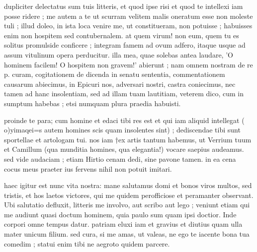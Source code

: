 


 dupliciter delectatus sum tuis litteris, et quod ipse risi et quod te intellexi iam posse ridere ; me autem a te ut scurram velitem malis oneratum esse non moleste tuli ; illud doleo, in ista loca venire me, ut constitueram, non potuisse ; habuisses enim non hospitem sed contubernalem. at quem virum! non eum, quem tu es solitus promulside conficere ; integram famem ad ovum adfero, itaque usque ad assum vitulinum opera perducitur. illa mea, quae solebas antea laudare, 'O hominem facilem! O hospitem non gravem!' abierunt ; nam omnem nostram de re p. curam, cogitationem de dicenda in senatu sententia, commentationem causarum abiecimus, in Epicuri nos, adversari nostri, castra coniecimus, nec tamen ad hanc insolentiam, sed ad illam tuam lautitiam, veterem dico, cum in sumptum habebas ; etsi numquam plura praedia habuisti.

 proinde te para; cum homine et edaci tibi res est et qui iam aliquid intellegat ( o)yimaqei=s autem homines scis quam insolentes sint) ; dediscendae tibi sunt sportellae et artologam tui. nos iam †ex artis tantum habemus, ut Verrium tuum et Camillum (qua munditia homines, qua elegantia!) vocare saepius audeamus. sed vide audaciam ; etiam Hirtio cenam dedi, sine pavone tamen. in ea cena cocus meus praeter ius fervens nihil non potuit imitari.

 haec igitur est nunc vita nostra: mane salutamus domi et bonos viros multos, sed tristis, et hos laetos victores, qui me quidem perofficiose et peramanter observant. Ubi salutatio defluxit, litteris me involvo, aut scribo aut lego ; veniunt etiam qui me audiunt quasi doctum hominem, quia paulo sum quam ipsi doctior. Inde corpori omne tempus datur. patriam eluxi iam et gravius et diutius quam ulla mater unicum filium. sed cura, si me amas, ut valeas, ne ego te iacente bona tua comedim ; statui enim tibi ne aegroto quidem parcere.

